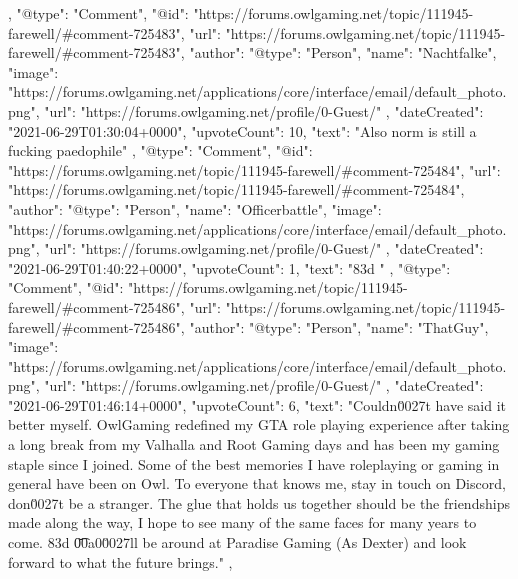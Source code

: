 {{        },
        {
            "@type": "Comment",
            "@id": "https://forums.owlgaming.net/topic/111945-farewell/#comment-725483",
            "url": "https://forums.owlgaming.net/topic/111945-farewell/#comment-725483",
            "author": {
                "@type": "Person",
                "name": "Nachtfalke",
                "image": "https://forums.owlgaming.net/applications/core/interface/email/default_photo.png",
                "url": "https://forums.owlgaming.net/profile/0-Guest/"
            },
            "dateCreated": "2021-06-29T01:30:04+0000",
            "upvoteCount": 10,
            "text": "Also norm is still a fucking paedophile\n \n"
        },
        {
            "@type": "Comment",
            "@id": "https://forums.owlgaming.net/topic/111945-farewell/#comment-725484",
            "url": "https://forums.owlgaming.net/topic/111945-farewell/#comment-725484",
            "author": {
                "@type": "Person",
                "name": "Officerbattle",
                "image": "https://forums.owlgaming.net/applications/core/interface/email/default_photo.png",
                "url": "https://forums.owlgaming.net/profile/0-Guest/"
            },
            "dateCreated": "2021-06-29T01:40:22+0000",
            "upvoteCount": 1,
            "text": "\ud83d \n"
        },
        {
            "@type": "Comment",
            "@id": "https://forums.owlgaming.net/topic/111945-farewell/#comment-725486",
            "url": "https://forums.owlgaming.net/topic/111945-farewell/#comment-725486",
            "author": {
                "@type": "Person",
                "name": "ThatGuy",
                "image": "https://forums.owlgaming.net/applications/core/interface/email/default_photo.png",
                "url": "https://forums.owlgaming.net/profile/0-Guest/"
            },
            "dateCreated": "2021-06-29T01:46:14+0000",
            "upvoteCount": 6,
            "text": "Couldn\u0027t have said it better myself. OwlGaming redefined my GTA role playing experience after taking a long break from my Valhalla and Root Gaming days and has been my gaming staple since I joined. Some of the best memories I have roleplaying or gaming in general have been on Owl. To everyone that knows me, stay in touch on Discord, don\u0027t be a stranger. The glue that holds us together should be the friendships made along the way, I hope to see many of the same faces for many years to come. \ud83d \n\n\n\t\u00a0\n \n\n\n\tI\u0027ll be around at Paradise Gaming (As Dexter) and look forward to what the future brings.\n \n"
        },
}
